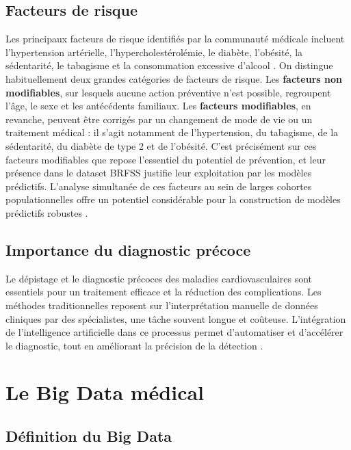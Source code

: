 \documentclass[12pt,a4paper]{report}
\begin{document}
\subsection{Facteurs de risque}

Les principaux facteurs de risque identifiés par la communauté médicale incluent
l'hypertension artérielle, l'hypercholestérolémie, le diabète, l'obésité, la
sédentarité, le tabagisme et la consommation excessive d'alcool \cite{fuster2014}.
On distingue habituellement deux grandes catégories de facteurs de risque. Les
\textbf{facteurs non modifiables}, sur lesquels aucune action préventive n'est
possible, regroupent l'âge, le sexe et les antécédents familiaux. Les \textbf{facteurs
modifiables}, en revanche, peuvent être corrigés par un changement de mode de vie
ou un traitement médical : il s'agit notamment de l'hypertension, du tabagisme, de
la sédentarité, du diabète de type 2 et de l'obésité. C'est précisément sur ces
facteurs modifiables que repose l'essentiel du potentiel de prévention, et leur
présence dans le dataset \acs{BRFSS} justifie leur exploitation par les modèles
prédictifs. L'analyse simultanée de ces facteurs au sein de larges cohortes
populationnelles offre un potentiel considérable pour la construction de modèles
prédictifs robustes \cite{weng2017}.

\subsection{Importance du diagnostic précoce}

Le dépistage et le diagnostic précoces des maladies cardiovasculaires sont essentiels
pour un traitement efficace et la réduction des complications. Les méthodes
traditionnelles reposent sur l'interprétation manuelle de données cliniques par des
spécialistes, une tâche souvent longue et coûteuse. L'intégration de l'intelligence
artificielle dans ce processus permet d'automatiser et d'accélérer le diagnostic,
tout en améliorant la précision de la détection \cite{rajpurkar2022}.

\section{Le Big Data médical}

\subsection{Définition du Big Data}
\end{document}
